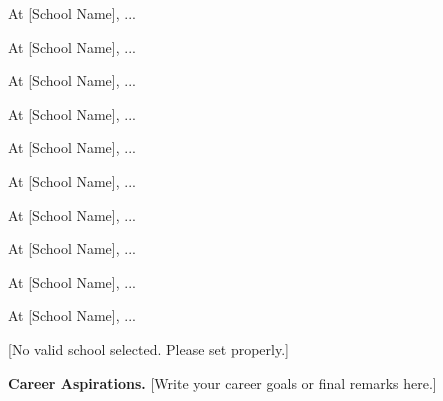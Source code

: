 \documentclass[11pt]{article}
\newcounter{schoolID}
\newcommand{\schoolname}{[School Name]}
\newcommand{\schoolname}{University of California, Berkeley}
\newcommand{\schoolname}{Stanford University}
\newcommand{\schoolname}{Massachusetts Institute of Technology}
\newcommand{\schoolname}{Carnegie Mellon University}
\newcommand{\schoolname}{Georgia Institute of Technology}
\newcommand{\schoolname}{New York University}
\newcommand{\schoolname}{Columbia University}
\newcommand{\schoolname}{Cornell University}
\newcommand{\schoolname}{University of Washington}
\newcommand{\schoolname}{University of Illinois at Urbana-Champaign}
\newcommand{\schoolname}{University of California, San Diego}
\newcommand{\schoolname}{Rice University}
\newcommand{\schoolname}{[School Name]}
\begin{document}
\or
  At {\schoolname}, ...
  
\or
  At {\schoolname}, ...
  
\or
  At {\schoolname}, ...

\or
  At {\schoolname}, ...

\or
  At {\schoolname}, ...

\or
  At {\schoolname}, ...

\or
  At {\schoolname}, ...

\or
  At {\schoolname}, ...

\or
  At {\schoolname}, ...

\or
  At {\schoolname}, ...

\else
  [No valid school selected. Please set \setcounter{schoolID}{X} properly.]
\fi


\textbf{Career Aspirations.} [Write your career goals or final remarks here.]

\clearpage
\printbibliography
\end{document}
